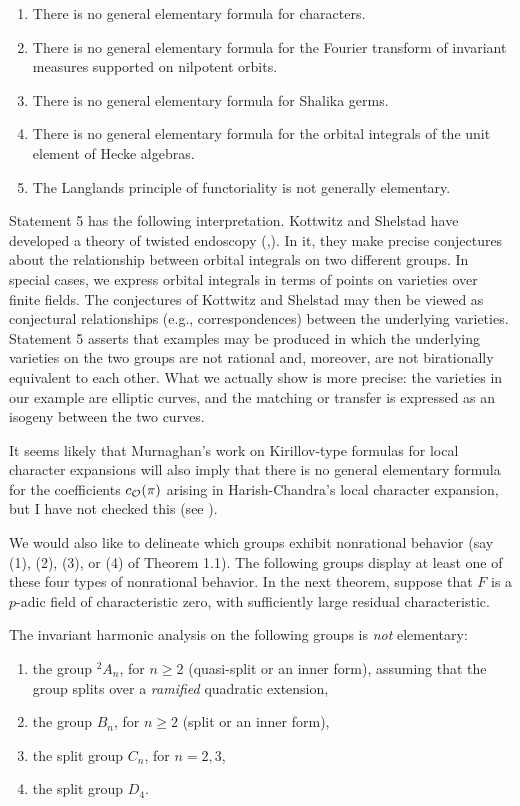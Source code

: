 \documentclass{amsart}
\begin{document}
\begin{enumerate}[label=(\arabic*)]
\item
There is no general elementary formula for characters.
\item
There is no general elementary formula for the Fourier transform of 
invariant measures supported on nilpotent
orbits.
\item
There is no general elementary formula for Shalika germs.
\item
There is no general elementary formula for the orbital integrals of the
unit element of Hecke algebras.
\item
The Langlands principle of functoriality
 is not generally elementary. 
\end{enumerate}
\endproclaim

Statement 5 has the
following interpretation.  Kottwitz and Shelstad have developed
a theory of twisted endoscopy (\cite{KS1},\cite{KS2}).  In it,
 they make precise conjectures
about the relationship between orbital integrals on two different groups.
In special cases, we express orbital integrals in terms of points on varieties
over finite fields.  The conjectures of Kottwitz and Shelstad may
then be viewed as conjectural relationships (e.g., correspondences) between
the underlying varieties.   Statement 5 asserts that examples may be
produced in which the underlying
varieties on the two groups are not rational and, moreover, are not
birationally equivalent to each other.  What we actually show is more
precise: the varieties in our example are elliptic curves, and the
matching or transfer is expressed as an isogeny between the two
curves.

It seems likely that Murnaghan's work on Kirillov-type formulas for
local character expansions will also imply that there is no general
elementary formula for the coefficients $c_{{\mathcal O}}(\pi)$ arising
in Harish-Chandra's local character expansion, but I have not
checked this (see \cite{M2}).

We would also like to delineate which groups exhibit 
nonrational behavior (say (1), (2), (3), or (4) of Theorem 1.1).  
The following
groups display at least one of these four types of
nonrational behavior.  In the next theorem, 
suppose that $F$ is a $p$-adic field
of characteristic zero, with sufficiently large residual characteristic.


The invariant harmonic analysis
on the following groups is {\it not} elementary:
\begin{enumerate}[label=(\arabic*)]
\item
the group ${}^2\! A_n$, for $n\ge 2$ 
     (quasi-split or an inner form),
    assuming that
the group splits over a {\it ramified} quadratic extension,
\item
   the group $B_n$, for $n\ge 2$
    (split or an inner form),
\item
   the split group $C_n$, for $n=2,3$, 
\item
  the split group $D_4$. 
\end{enumerate}
\endproclaim
\end{document}
